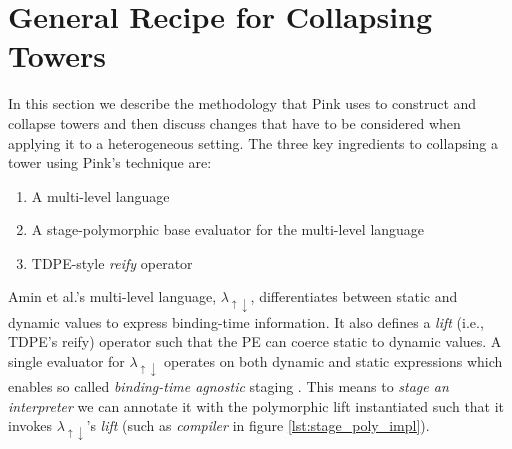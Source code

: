 \documentclass[a4paper,12pt,twoside,openright]{report}
\theoremstyle{definition}
\newcommand{\mslang}{$\lambda_{\uparrow\downarrow}$}
\begin{document}
\newpage
\section{General Recipe for Collapsing Towers}\label{sec:recipe}
In this section we describe the methodology that Pink uses to construct and collapse towers and then discuss changes that have to be considered when applying it to a heterogeneous setting. The three key ingredients to collapsing a tower using Pink's technique are:
\begin{enumerate}
    \item A multi-level language
    \item A stage-polymorphic base evaluator for the multi-level language
    \item TDPE-style \textit{reify} operator
\end{enumerate}

Amin et al.'s multi-level language, \mslang, differentiates between static and dynamic values to express binding-time information. It also defines a \textit{lift} (i.e., TDPE's reify) operator such that the PE can coerce static to dynamic values. A single evaluator for \mslang{} operates on both dynamic and static expressions which enables so called \textit{binding-time agnostic} staging \cite{amin2017collapsing}. This means to \textit{stage an interpreter} we can annotate it with the polymorphic lift instantiated such that it invokes \mslang's \textit{lift} (such as \textit{compiler} in figure \ref{lst:stage_poly_impl}).
\end{document}

